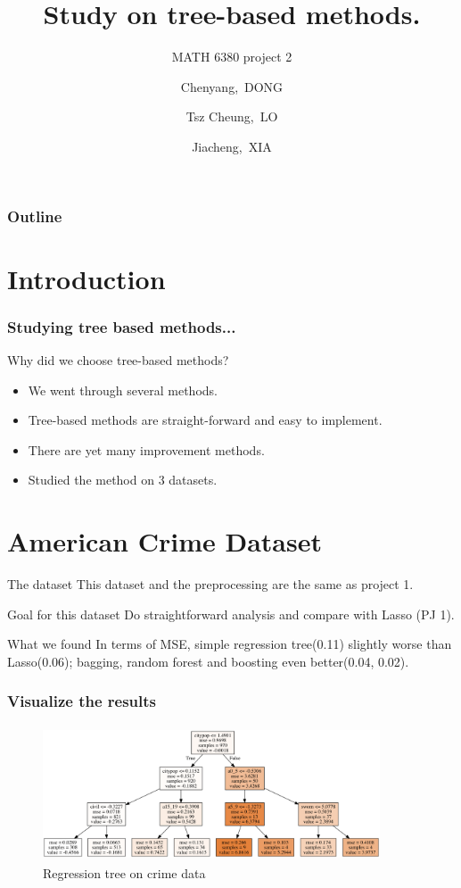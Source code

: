 \documentclass{beamer}
\title[MATH 6380 Project 2]{Study on tree-based methods.}
\subtitle{MATH 6380 project 2}
\author[C.Dong, T.C.LO, J.Xia]
{Chenyang,~DONG \and Tsz Cheung,~LO \and Jiacheng,~XIA}
\begin{document}
\frame{\titlepage}

\begin{frame}
\frametitle{Outline}
\tableofcontents
\end{frame}

\section{Introduction}
\begin{frame}
\frametitle{Studying tree based methods...}
Why did we choose tree-based methods?
\pause
\begin{itemize}
\item We went through several methods.
\pause
\item Tree-based methods are straight-forward and easy to implement.
\pause
\item There are yet many improvement methods.
\pause
\item Studied the method on 3 datasets.
\end{itemize}
\end{frame}


\section{American Crime Dataset}
\begin{frame}
\begin{block}{The dataset}
This dataset and the preprocessing are the same as project 1.
\end{block}
\pause
\begin{exampleblock}{Goal for this dataset}
Do straightforward analysis and compare with Lasso (PJ 1).
\end{exampleblock}
\begin{alertblock}{What we found}
In terms of MSE, simple regression tree(0.11) slightly worse than Lasso(0.06); bagging, random forest and boosting even better(0.04, 0.02).
\end{alertblock}
\end{frame}

\begin{frame}
\frametitle{Visualize the results}
\begin{figure}[h]
  \centering
  \includegraphics[width=10cm, height=4cm]{crime_treetu}
  \caption{Regression tree on crime data}
\end{figure}
\end{frame}
\end{document}
